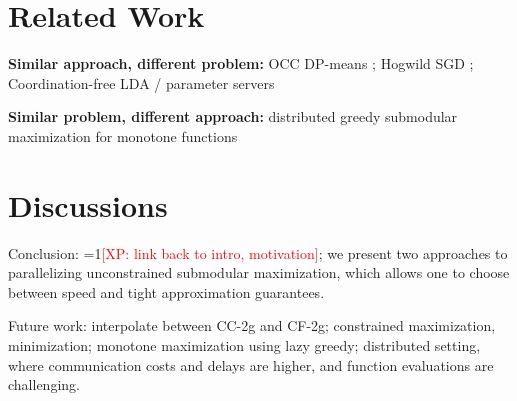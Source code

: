 \documentclass{article} %
\newcommand{\hogwild}{CF-2g}
\newcommand{\occ}{CC-2g}
\newcommand{\Comments}{1}
\newcommand{\note}[2]{\ifnum\Comments=1\textcolor{#1}{#2}\fi}
\newcommand{\xinghao}[1]{\note{red}{[XP: #1]}}
\begin{document}
\section{Related Work \label{sec:related}}
\textbf{Similar approach, different problem: } OCC DP-means \cite{pan2013}; Hogwild SGD \cite{Recht11}; Coordination-free LDA \cite{Ahmed12} / parameter servers \cite{li2013, ho2013}

\textbf{Similar problem, different approach: } distributed greedy submodular maximization for monotone functions \cite{Mirzasoleiman2013}






\section{Discussions \label{sec:discussions}}

Conclusion: \xinghao{link back to intro, motivation}; we present two approaches to parallelizing unconstrained submodular maximization, which allows one to choose between speed and tight approximation guarantees.

Future work: interpolate between \occ{} and \hogwild{}; constrained maximization, minimization; monotone maximization using lazy greedy; distributed setting, where communication costs and delays are higher, and function evaluations are challenging.


{\footnotesize




}

\newpage
\appendix
\end{document}
